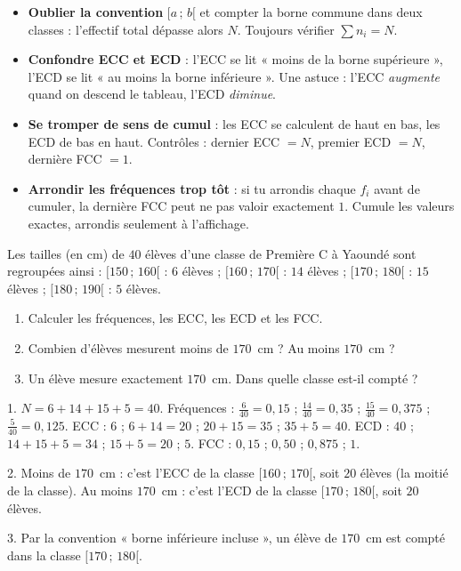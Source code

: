 \documentclass[11pt]{article}
\begin{document}
\begin{attention}
\begin{itemize}
\item \textbf{Oublier la convention} $[a\,;\,b[$ et compter la borne commune dans deux classes : l'effectif total dépasse alors $N$. Toujours vérifier $\sum n_i = N$.
\item \textbf{Confondre ECC et ECD} : l'ECC se lit « moins de la borne supérieure », l'ECD se lit « au moins la borne inférieure ». Une astuce : l'ECC \emph{augmente} quand on descend le tableau, l'ECD \emph{diminue}.
\item \textbf{Se tromper de sens de cumul} : les ECC se calculent de haut en bas, les ECD de bas en haut. Contrôles : dernier ECC $= N$, premier ECD $= N$, dernière FCC $= 1$.
\item \textbf{Arrondir les fréquences trop tôt} : si tu arrondis chaque $f_i$ avant de cumuler, la dernière FCC peut ne pas valoir exactement $1$. Cumule les valeurs exactes, arrondis seulement à l'affichage.
\end{itemize}
\end{attention}

\begin{exercice}
Les tailles (en cm) de $40$ élèves d'une classe de Première C à Yaoundé sont regroupées ainsi : $[150\,;\,160[$ : $6$ élèves ; $[160\,;\,170[$ : $14$ élèves ; $[170\,;\,180[$ : $15$ élèves ; $[180\,;\,190[$ : $5$ élèves.
\begin{enumerate}
\item Calculer les fréquences, les ECC, les ECD et les FCC.
\item Combien d'élèves mesurent moins de $170$~cm ? Au moins $170$~cm ?
\item Un élève mesure exactement $170$~cm. Dans quelle classe est-il compté ?
\end{enumerate}
\end{exercice}

\begin{corrige}[Exercice 1]
1. $N = 6+14+15+5 = 40$. Fréquences : $\frac{6}{40} = 0{,}15$ ; $\frac{14}{40} = 0{,}35$ ; $\frac{15}{40} = 0{,}375$ ; $\frac{5}{40} = 0{,}125$. ECC : $6$ ; $6+14 = 20$ ; $20+15 = 35$ ; $35+5 = 40$. ECD : $40$ ; $14+15+5 = 34$ ; $15+5 = 20$ ; $5$. FCC : $0{,}15$ ; $0{,}50$ ; $0{,}875$ ; $1$.

2. Moins de $170$~cm : c'est l'ECC de la classe $[160\,;\,170[$, soit $20$ élèves (la moitié de la classe). Au moins $170$~cm : c'est l'ECD de la classe $[170\,;\,180[$, soit $20$ élèves.

3. Par la convention « borne inférieure incluse », un élève de $170$~cm est compté dans la classe $[170\,;\,180[$.
\end{corrige}
\end{document}
